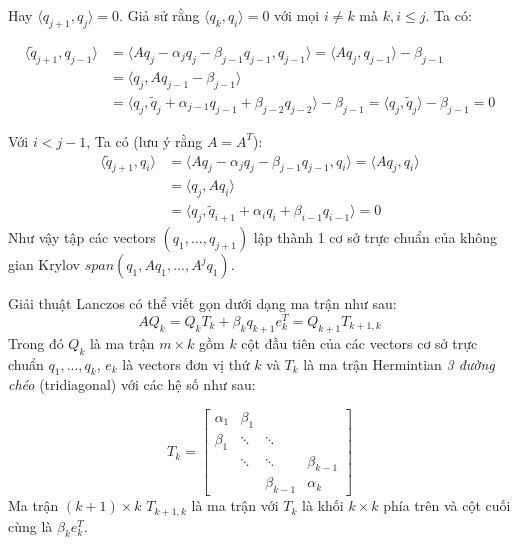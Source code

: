 Hay $\langle q_{j+1}, q_j \rangle = 0$. Giả sử rằng $\langle q_k, q_i \rangle = 0$ với mọi 
$i \neq k$ mà $k,i \leq j$. Ta có:

\begin{equation*}
    \begin{split}
        \langle \tilde{q}_{j+1}, q_{j-1} \rangle &= \langle Aq_j - \alpha_jq_j - \beta_{j-1}q_{j-1}, q_{j-1} \rangle 
        = \langle Aq_j, q_{j-1} \rangle - \beta_{j-1} \\
        &= \langle q_j, Aq_{j-1} - \beta_{j-1} \rangle \\
        &= \langle q_j, \tilde{q}_j + \alpha_{j-1}q_{j-1} + \beta_{j-2}q_{j-2} \rangle - \beta_{j-1}
        = \langle q_j, \tilde{q}_j \rangle - \beta_{j - 1} = 0
    \end{split}
\end{equation*}

Với $i < j - 1$, Ta có (lưu ý rằng $A = A^T$):
\begin{equation*}
    \begin{split}
        \langle \tilde{q}_{j+1}, q_{i} \rangle &= \langle Aq_j - \alpha_jq_j - \beta_{j-1}q_{j-1}, q_{i} \rangle 
        = \langle Aq_j, q_i \rangle \\
        &= \langle q_j, Aq_i \rangle \\
        &= \langle q_j, \tilde{q}_{i+1} + \alpha_iq_i + \beta_{i - 1}q_{i - 1} \rangle = 0
    \end{split}
\end{equation*}
Như vậy tập các vectors $(q_1, ..., q_{j+1})$ lập thành 1 cơ sở trực chuẩn của không gian Krylov 
$span(q_1, Aq_1, ..., A^jq_1)$.

Giải thuật Lanczos có thể viết gọn dưới dạng ma trận như sau:
\begin{equation}
    AQ_k = Q_kT_k + \beta_kq_{k+1}e_k^T = Q_{k+1}T_{k+1, k}
\end{equation}
Trong đó $Q_k$ là ma trận $m \times k$ gồm $k$ cột đầu tiên của các vectors cơ sở trực chuẩn 
$q_1, ..., q_k$, $e_k$ là vectors đơn vị thứ $k$ và $T_k$ là ma trận Hermintian 
\textit{3 đường chéo} (tridiagonal) với các hệ số như sau:

\begin{equation}
    T_k = \begin{bmatrix}
        \alpha_1  & \beta_1 & & \\
        \beta_1 & \ddots & \ddots & \\
        & \ddots & \ddots & \beta_{k-1} \\
        & & \beta_{k-1} & \alpha_k
    \end{bmatrix}
\end{equation}
Ma trận $(k+1) \times k$ $T_{k+1,k}$ là ma trận với $T_k$ là khối $k \times k$ phía trên và
cột cuối cùng là $\beta_k e_k^T$.